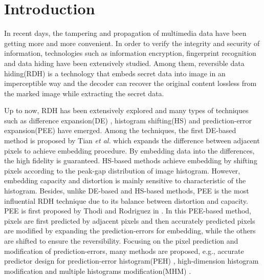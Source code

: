 \documentclass[review,3p,10pt,sort&compress]{elsarticle}
\begin{document}
\section{Introduction}\label{sec:1}
In recent days, the tampering and propagation of multimedia data have been getting more and more convenient. In order to verify the integrity and security of information, technologies such as information encryption, fingerprint recognition and data hiding have been extensively studied. Among them, reversible data hiding(RDH) \cite{
Shi2016Reversible}
is a technology that embeds secret data into image in an imperceptible way and the decoder can recover the original content lossless from the marked image while extracting the secret data.

Up to now, RDH has been extensively explored and many types of techniques such as difference expansion(DE) \cite{
Tian2003DE,
Qin2013An,
Thodi2007Expansion,
Hu2009DE,
Li2013A},
histogram shifting(HS) \cite{
Hong2009Reversible,
Hong2010A,
Xiaolong2013General,
Wang2018A}
and prediction-error expansion(PEE) \cite{
Sachnev2009Reversible,
Tsai2009Reversible,
Gao2011Lossless,
Li2011Efficient,
Hong2011Adaptive,
Wu2012Reversible,
Qin2013An,
Ou2013Pairwise,
Dragoi2014Local,
Li2015Efficient,
Dragoi2016Adaptive,
Wang2017Rate}
have emerged. Among the techniques, the first DE-based method is proposed by Tian \emph{et al.} \cite{Tian2003DE} which expands the difference between adjacent pixels to achieve embedding procedure. By embedding data into the differences, the high fidelity is guaranteed. HS-based methods achieve embedding by shifting pixels according to the peak-gap distribution of image histogram. However, embedding capacity and distortion is mainly sensitive to characteristic of the histogram. Besides, unlike DE-based and HS-based methods, PEE is the most influential RDH technique due to its balance between distortion and capacity. PEE is first proposed by Thodi and Rodriguez in \cite{Thodi2007Expansion}. In this PEE-based method, pixels are first predicted by adjacent pixels and then accurately predicted pixels are modified by expanding the prediction-errors for embedding, while the others are shifted to ensure the reversibility. Focusing on the pixel prediction and modification of prediction-errors, many methods are proposed, e.g., accurate predictor design for prediction-error histogram(PEH) \cite{Thodi2007Expansion,Fallahpour2008Reversible,Hu2009DE,Hong2009Reversible,Sachnev2009Reversible,Ioan2014Local,Ioan2015On}, high-dimension histogram modification \cite{Ou2013Pairwise,Li2013A,Dragoi2016Adaptive} and multiple histograms modification(MHM) \cite{Li2015Efficient,Xiang2015A,Bo2016Improved}.
\end{document}
